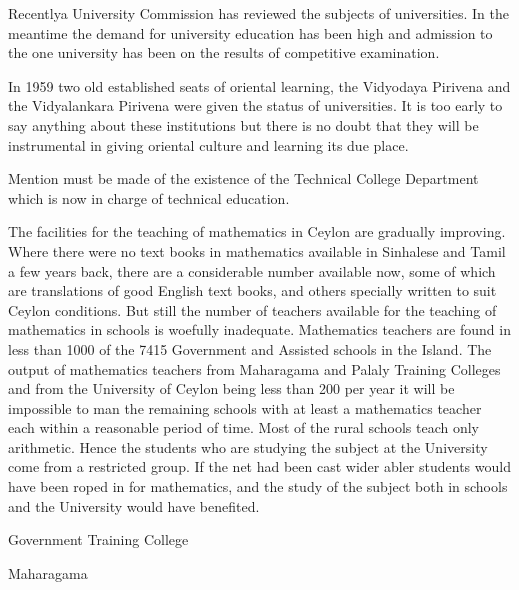 Recently\pageoriginale a University Commission has reviewed the subjects of universities. In the meantime the demand for university education has been high and admission to the one university has been on the results of competitive examination.

In 1959 two old established seats of oriental learning, the Vidyodaya Pirivena and the Vidyalankara Pirivena were given the status of universities. It is too early to say anything about these institutions but there is no doubt that they will be instrumental in giving oriental culture and learning its due place.

Mention must be made of the existence of the Technical College Department which is now in charge of technical education.

The facilities for the teaching of mathematics in Ceylon are gradually improving. Where there were no text books in mathematics available in Sinhalese and Tamil a few years back, there are a considerable number available now, some of which are translations of good English text books, and others specially written to suit Ceylon conditions. But still the number of teachers available for the teaching of mathematics in schools is woefully inadequate. Mathematics teachers are found in less than 1000 of the 7415 Government and Assisted schools in the Island. The output of mathematics teachers from Maharagama and Palaly Training Colleges and from the University of Ceylon being less than 200 per year it will be impossible to man the remaining schools with at least a mathematics teacher each within a reasonable period of time. Most of the rural schools teach only arithmetic. Hence the students who are studying the subject at the University come from a restricted group. If the net had been cast wider abler students would have been roped in for mathematics, and the study of the subject both in schools and the University would have benefited.

\bigskip
\medskip

{\fontsize{9pt}{11pt}\selectfont
Government Training College

Maharagama
}\relax

